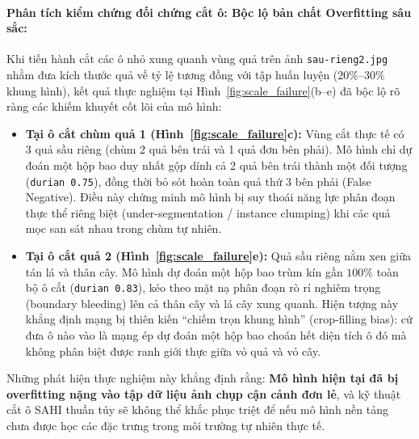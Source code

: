 \documentclass[12pt,a4paper]{article}
\begin{document}
\paragraph{Phân tích kiểm chứng đối chứng cắt ô: Bộc lộ bản chất Overfitting sâu sắc:}
Khi tiến hành cắt các ô nhỏ xung quanh vùng quả trên ảnh \texttt{sau-rieng2.jpg} nhằm đưa kích thước quả về tỷ lệ tương đồng với tập huấn luyện ($20\%\text{--}30\%$ khung hình), kết quả thực nghiệm tại Hình~\ref{fig:scale_failure}(b--e) đã bộc lộ rõ ràng các khiếm khuyết cốt lõi của mô hình:
\begin{itemize}
    \item \textbf{Tại ô cắt chùm quả 1 (Hình~\ref{fig:scale_failure}c):} Vùng cắt thực tế có 3 quả sầu riêng (chùm 2 quả bên trái và 1 quả đơn bên phải). Mô hình chỉ dự đoán một hộp bao duy nhất gộp dính cả 2 quả bên trái thành một đối tượng (\texttt{durian 0.75}), đồng thời bỏ sót hoàn toàn quả thứ 3 bên phải (False Negative). Điều này chứng minh mô hình bị suy thoái năng lực phân đoạn thực thể riêng biệt (under-segmentation / instance clumping) khi các quả mọc san sát nhau trong chùm tự nhiên.
    \item \textbf{Tại ô cắt quả 2 (Hình~\ref{fig:scale_failure}e):} Quả sầu riêng nằm xen giữa tán lá và thân cây. Mô hình dự đoán một hộp bao trùm kín gần $100\%$ toàn bộ ô cắt (\texttt{durian 0.83}), kéo theo mặt nạ phân đoạn rò rỉ nghiêm trọng (boundary bleeding) lên cả thân cây và lá cây xung quanh. Hiện tượng này khẳng định mạng bị thiên kiến ``chiếm trọn khung hình'' (crop-filling bias): cứ đưa ô nào vào là mạng ép dự đoán một hộp bao choán hết diện tích ô đó mà không phân biệt được ranh giới thực giữa vỏ quả và vỏ cây.
\end{itemize}
Những phát hiện thực nghiệm này khẳng định rằng: \textbf{Mô hình hiện tại đã bị overfitting nặng vào tập dữ liệu ảnh chụp cận cảnh đơn lẻ}, và kỹ thuật cắt ô SAHI thuần túy sẽ không thể khắc phục triệt để nếu mô hình nền tảng chưa được học các đặc trưng trong môi trường tự nhiên thực tế.
\end{document}
